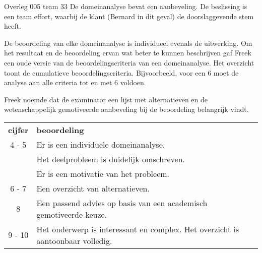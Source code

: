 \documentclass{article}
\begin{document}
\begin{Minutes}{Overleg 005 team 33}
De domeinanalyse bevat een aanbeveling. De beslissing is een team effort, waarbij de klant (Bernard in dit geval) de doorslaggevende stem heeft.

De beoordeling van elke domeinanalyse is individueel evenals de uitwerking.
Om het resultaat en de beoordeling ervan wat beter te kunnen beschrijven gaf Freek
een oude versie van de beoordelingscriteria van een domeinanalyse. Het overzicht
toont de cumulatieve beoordelingscriteria. Bijvoorbeeld, voor een 6 moet de analyse aan alle
criteria tot en met 6 voldoen.

Freek noemde dat de examinator een lijst met alternatieven en de wetenschappelijk gemotiveerde aanbeveling bij
de beoordeling belangrijk vindt.

\begin{center}
\begin{tabular}{|c|p{30em}|}
{\bf cijfer} & {\bf beoordeling} \\
 4 - 5  & Er is een individuele domeinanalyse. \\
        & Het deelprobleem is duidelijk omschreven.\\
        & Er is een motivatie van het probleem.\\
 6 - 7  & Een overzicht van alternatieven. \\
 8      & Een passend advies op basis van een academisch gemotiveerde keuze.\\
 9 - 10 & Het onderwerp is interessant en complex. Het overzicht is aantoonbaar volledig.\\
\end{tabular}
\end{center}



\end{Minutes}
\end{document}
